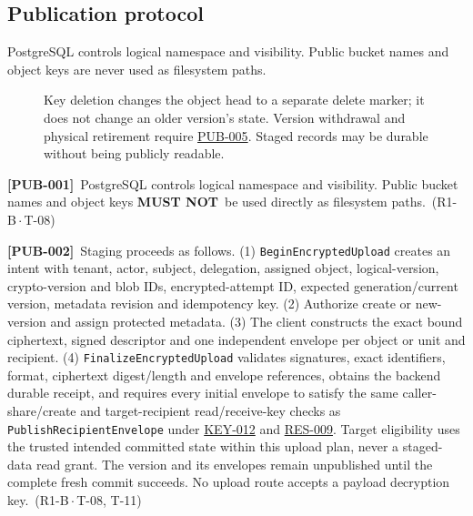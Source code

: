 \documentclass[11pt,a4paper]{article}
\newcommand{\mustnot}{\textbf{MUST NOT}}
\newcommand{\code}[1]{{\small\nolinkurl{#1}}}
\newcommand{\rr}[1]{\hyperlink{req:#1}{#1}}
\newcommand{\reqtag}[2]{{\footnotesize\color{accent}(#1\,$\cdot$\,#2)}}
\newcommand{\req}[4]{\par\noindent\hypertarget{req:#1}{\textbf{[#1]}}\ #4\ \reqtag{#2}{#3}\par}
\begin{document}
\subsection{Publication protocol}\label{sec:publication}
PostgreSQL controls logical namespace and visibility. Public bucket names and object keys are never used as filesystem paths.
\begin{figure}[ht]
\centering
{}
\caption[Version lifecycle]{Key deletion changes the object head to a separate delete marker; it does not change an older version's state. Version withdrawal and physical retirement require \rr{PUB-005}. Staged records may be durable without being publicly readable.}\label{fig:pubstates}
\end{figure}
\req{PUB-001}{R1-B}{T-08}{PostgreSQL controls logical namespace and visibility. Public bucket names and object keys \mustnot\ be used directly as filesystem paths.}
\req{PUB-002}{R1-B}{T-08, T-11}{Staging proceeds as follows. (1) \code{BeginEncryptedUpload} creates an intent with tenant, actor, subject, delegation, assigned object, logical-version, crypto-version and blob IDs, encrypted-attempt ID, expected generation/current version, metadata revision and idempotency key. (2) Authorize create or new-version and assign protected metadata. (3) The client constructs the exact bound ciphertext, signed descriptor and one independent envelope per object or unit and recipient. (4) \code{FinalizeEncryptedUpload} validates signatures, exact identifiers, format, ciphertext digest/length and envelope references, obtains the backend durable receipt, and requires every initial envelope to satisfy the same caller-share/create and target-recipient read/receive-key checks as \code{PublishRecipientEnvelope} under \rr{KEY-012} and \rr{RES-009}. Target eligibility uses the trusted intended committed state within this upload plan, never a staged-data read grant. The version and its envelopes remain unpublished until the complete fresh commit succeeds. No upload route accepts a payload decryption key.}
\end{document}
